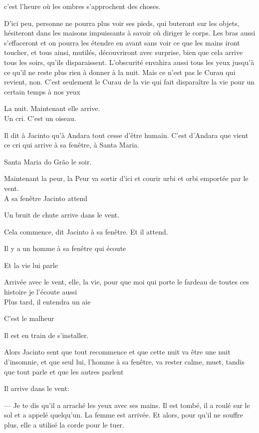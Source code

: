 c'est l'heure où les ombres s'approchent des choses.

D'ici peu, personne ne pourra plus voir ses pieds, qui buteront sur les
objets, hésiteront dans les maisons impuissants à savoir où diriger le
corps. Les bras aussi s'effaceront et on pourra les étendre en avant
sans voir ce que les mains iront toucher, et tous ainsi, mutilés,
découvriront avec surprise, bien que cela arrive tous les soirs, qu'ils
disparaissent. L'obscurité envahira aussi tous les yeux jusqu'à ce qu'il
ne reste plus rien à donner à la nuit. Mais ce n'est pas le Curau qui
revient, non. C'est seulement le Curau de la vie qui fait disparaître la
vie pour un certain temps à nos yeux

La nuit. Maintenant elle arrive.\\

Un cri. C'est un oiseau.

Il dit à Jacinto qu'à Andara tout cesse d'être humain. C'est d'Andara
que vient ce cri qui arrive à sa fenêtre, à Santa Maria.

Santa Maria do Grão le soir.

Maintenant la peur, la Peur va sortir d'ici et courir urbi et orbi
emportée par le vent.\\

A sa fenêtre Jacinto attend

Un bruit de chute arrive dans le vent.

Cela commence, dit Jacinto à sa fenêtre. Et il attend.

Il y a un homme à sa fenêtre qui écoute

Et la vie lui parle

Arrivée avec le vent, elle, la vie, pour que moi qui porte le fardeau de
toutes ces histoire je l'écoute aussi\\

Plus tard, il entendra un aie

C'est le malheur

Il est en train de s'installer.

Alors Jacinto sent que tout recommence et que cette nuit va être une
nuit d'insomnie, et que seul lui, l'homme à sa fenêtre, va rester calme,
muet, tandis que tout parle et que les autres parlent

Il arrive dans le vent:

--- Je te dis qu'il a arraché les yeux avec ses mains. Il est tombé, il a
roulé sur le sol et a appelé quelqu'un. La femme est arrivée. Et alors,
pour qu'il ne souffre plus, elle a utilisé la corde pour le tuer.

